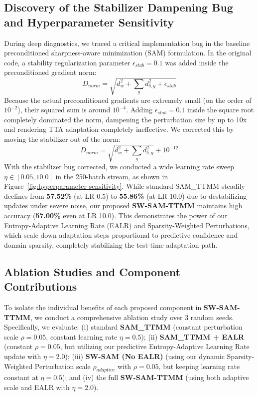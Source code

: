 \documentclass{article}
\theoremstyle{plain}
\theoremstyle{definition}
\theoremstyle{remark}
\begin{document}
\subsection{Discovery of the Stabilizer Dampening Bug and Hyperparameter Sensitivity}
During deep diagnostics, we traced a critical implementation bug in the baseline preconditioned sharpness-aware minimization (SAM) formulation. In the original code, a stability regularization parameter $\epsilon_{stab} = 0.1$ was added inside the preconditioned gradient norm:
\begin{equation}
    D_{norm} = \sqrt{d_w^2 + \sum_g d_{\delta, g}^2 + \epsilon_{stab}}
\end{equation}
Because the actual preconditioned gradients are extremely small (on the order of $10^{-2}$), their squared sum is around $10^{-4}$. Adding $\epsilon_{stab} = 0.1$ inside the square root completely dominated the norm, dampening the perturbation size by up to 10x and rendering TTA adaptation completely ineffective. We corrected this by moving the stabilizer out of the norm:
\begin{equation}
    D_{norm} = \sqrt{d_w^2 + \sum_g d_{\delta, g}^2} + 10^{-12}
\end{equation}
With the stabilizer bug corrected, we conducted a wide learning rate sweep $\eta \in [0.05, 10.0]$ in the 250-batch stream, as shown in Figure~\ref{fig:hyperparameter-sensitivity}.
While standard SAM\_TTMM steadily declines from \textbf{57.52\%} (at LR 0.5) to \textbf{55.86\%} (at LR 10.0) due to destabilizing updates under severe noise, our proposed \textbf{SW-SAM-TTMM} maintains high accuracy (\textbf{57.00\%} even at LR 10.0). This demonstrates the power of our Entropy-Adaptive Learning Rate (EALR) and Sparsity-Weighted Perturbations, which scale down adaptation steps proportional to predictive confidence and domain sparsity, completely stabilizing the test-time adaptation path.

\subsection{Ablation Studies and Component Contributions}
To isolate the individual benefits of each proposed component in \textbf{SW-SAM-TTMM}, we conduct a comprehensive ablation study over 3 random seeds. Specifically, we evaluate: (i) standard \textbf{SAM\_TTMM} (constant perturbation scale $\rho = 0.05$, constant learning rate $\eta = 0.5$); (ii) \textbf{SAM\_TTMM + EALR} (constant $\rho = 0.05$, but utilizing our predictive Entropy-Adaptive Learning Rate update with $\eta = 2.0$); (iii) \textbf{SW-SAM (No EALR)} (using our dynamic Sparsity-Weighted Perturbation scale $\rho_{adaptive}$ with $\rho = 0.05$, but keeping learning rate constant at $\eta = 0.5$); and (iv) the full \textbf{SW-SAM-TTMM} (using both adaptive scale and EALR with $\eta = 2.0$). 
\end{document}
